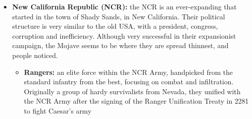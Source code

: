 \begin{itemize}
\item \textbf{New California Republic (NCR):} the NCR is an ever-expanding that started in the town of Shady Sands, in New California. Their political structure is very similar to the old USA, with a president, congress, corruption and inefficiency. Although very successful in their expansionist campaign, the Mojave seems to be where they are spread thinnest, and people noticed. 
	\begin{itemize}
	\item \textbf{Rangers:} an elite force within the NCR Army, handpicked from the standard infantry from the best, focusing on combat and infiltration. Originally a group of hardy survivalists from Nevada, they unified with the NCR Army after the signing of the Ranger Unification Treaty in 2281 to fight Caesar's army
	\end{itemize}


\end{itemize}

